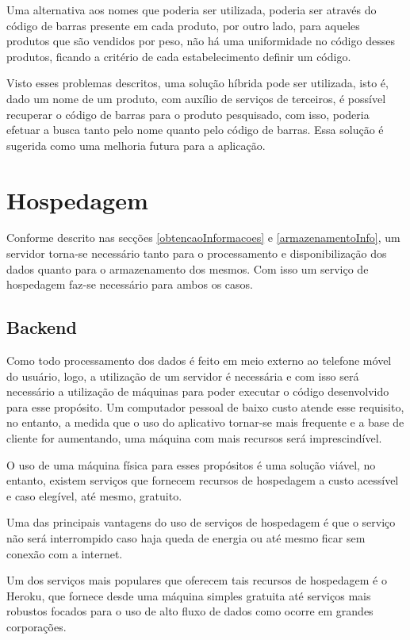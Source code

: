 Uma alternativa aos nomes que poderia ser utilizada, poderia ser através do código de barras presente em cada produto, por outro lado, para aqueles produtos que são vendidos por peso, não há uma uniformidade no código desses produtos, ficando a critério de cada estabelecimento definir um código.

Visto esses problemas descritos, uma solução híbrida pode ser utilizada, isto é, dado um nome de um produto, com auxílio de serviços de terceiros, é possível recuperar o código de barras para o produto pesquisado, com isso, poderia efetuar a busca tanto pelo nome quanto pelo código de barras. Essa solução é sugerida como uma melhoria futura para a aplicação.

\section{Hospedagem}

Conforme descrito nas secções \ref{obtencaoInformacoes} e \ref{armazenamentoInfo}, um servidor torna-se necessário tanto para o processamento e disponibilização dos dados quanto para o armazenamento dos mesmos. Com isso um serviço de hospedagem faz-se necessário para ambos os casos.

\subsection{Backend}

Como todo processamento dos dados é feito em meio externo ao telefone móvel do usuário, logo, a utilização de um servidor é necessária e com isso será necessário a utilização de máquinas para poder executar o código desenvolvido para esse propósito. Um computador pessoal de baixo custo atende esse requisito, no entanto, a medida que o uso do aplicativo tornar-se mais frequente e a base de cliente for aumentando, uma máquina com mais recursos será imprescindível.

O uso de uma máquina física para esses propósitos é uma solução viável, no entanto, existem serviços que fornecem recursos de hospedagem a custo acessível e caso elegível, até mesmo, gratuito.

Uma das principais vantagens do uso de serviços de hospedagem é que o serviço não será interrompido caso haja queda de energia ou até mesmo ficar sem conexão com a internet.

Um dos serviços mais populares que oferecem tais recursos de hospedagem é o Heroku, que fornece desde uma máquina simples gratuita até serviços mais robustos focados para o uso de alto fluxo de dados como ocorre em grandes corporações.

